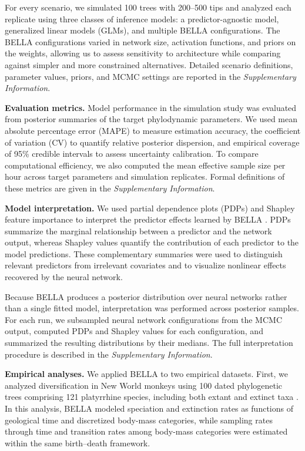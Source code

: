 For every scenario, we simulated 100 trees with 200--500 tips and analyzed each replicate using three classes of inference models: a predictor-agnostic model, generalized linear models (GLMs), and multiple BELLA configurations. The BELLA configurations varied in network size, activation functions, and priors on the weights, allowing us to assess sensitivity to architecture while comparing against simpler and more constrained alternatives. Detailed scenario definitions, parameter values, priors, and MCMC settings are reported in the \textit{Supplementary Information}.

\noindent\textbf{Evaluation metrics.} Model performance in the simulation study was evaluated from posterior summaries of the target phylodynamic parameters. We used mean absolute percentage error (MAPE) to measure estimation accuracy, the coefficient of variation (CV) to quantify relative posterior dispersion, and empirical coverage of 95\% credible intervals to assess uncertainty calibration. To compare computational efficiency, we also computed the mean effective sample size per hour across target parameters and simulation replicates. Formal definitions of these metrics are given in the \textit{Supplementary Information}.

\noindent\textbf{Model interpretation.} We used partial dependence plots (PDPs) and Shapley feature importance to interpret the predictor effects learned by BELLA \citep{friedman2001pdps,lundberg2017unified}. PDPs summarize the marginal relationship between a predictor and the network output, whereas Shapley values quantify the contribution of each predictor to the model predictions. These complementary summaries were used to distinguish relevant predictors from irrelevant covariates and to visualize nonlinear effects recovered by the neural network.

Because BELLA produces a posterior distribution over neural networks rather than a single fitted model, interpretation was performed across posterior samples. For each run, we subsampled neural network configurations from the MCMC output, computed PDPs and Shapley values for each configuration, and summarized the resulting distributions by their medians. The full interpretation procedure is described in the \textit{Supplementary Information}.

\noindent\textbf{Empirical analyses.} We applied BELLA to two empirical datasets. First, we analyzed diversification in New World monkeys using 100 dated phylogenetic trees comprising 121 platyrrhine species, including both extant and extinct taxa \citep{silvestro2019early}. In this analysis, BELLA modeled speciation and extinction rates as functions of geological time and discretized body-mass categories, while sampling rates through time and transition rates among body-mass categories were estimated within the same birth--death framework.

